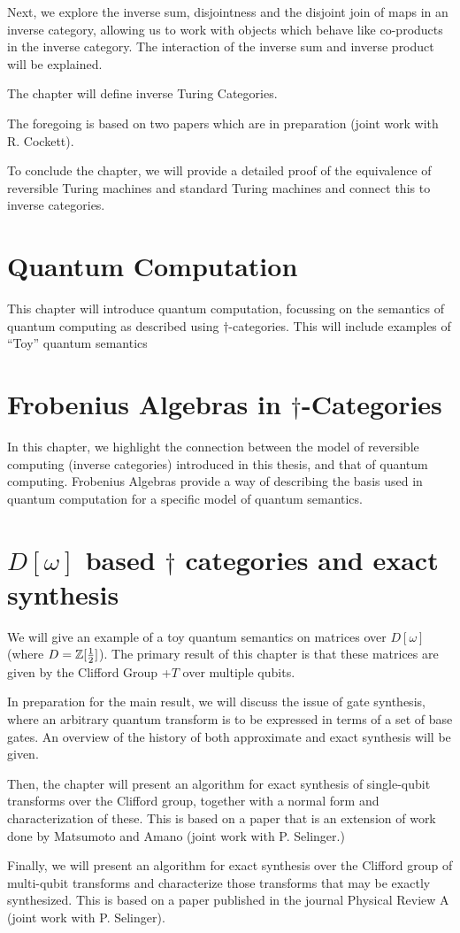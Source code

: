 Next, we explore the inverse sum, disjointness and the disjoint join of maps in an inverse
category, allowing us to work with objects which behave like co-products in the inverse category.
The interaction of the inverse sum and inverse product will be explained.

The chapter will define inverse Turing Categories.

The foregoing is based on two papers which are in preparation (joint work with R. Cockett).

To conclude the chapter, we will provide a detailed proof of the equivalence of reversible Turing
machines and standard Turing machines and connect this to inverse categories.

\section*{Quantum Computation}
This chapter will introduce quantum computation, focussing on
the semantics of quantum computing as described using $\dagger$-categories. This will include
examples of ``Toy'' quantum semantics

\section*{Frobenius Algebras in $\dagger$-Categories}

In this chapter, we highlight the connection between the model of reversible computing (inverse
categories) introduced in this thesis, and that of quantum computing. Frobenius Algebras provide a
way of describing the basis used in quantum computation for a specific model of quantum semantics.


\section*{$D[\omega]$ based $\dagger$ categories and exact synthesis}

We will give an example of a toy quantum semantics on matrices over $D[\omega]$ (where
$D = \mathbb{Z}[\frac{1}{2}]$). The primary result of this chapter is that these matrices are
given by the Clifford Group +$T$ over multiple qubits.

In preparation for the main result, we will discuss the issue of gate synthesis, where an arbitrary
quantum transform is to be expressed in terms of a set of base gates. An overview of the history of
both approximate and exact synthesis will be given.

Then, the chapter will present an algorithm for exact synthesis of single-qubit transforms over the
Clifford group, together with a normal form and characterization of these. This is based on a paper
that is an extension of work done by Matsumoto and Amano (joint work with P. Selinger.)

Finally, we will present an algorithm for exact synthesis over the Clifford group of multi-qubit
transforms and characterize those transforms that may be exactly synthesized. This is based on a
paper published in the journal Physical Review A (joint work with P. Selinger).

